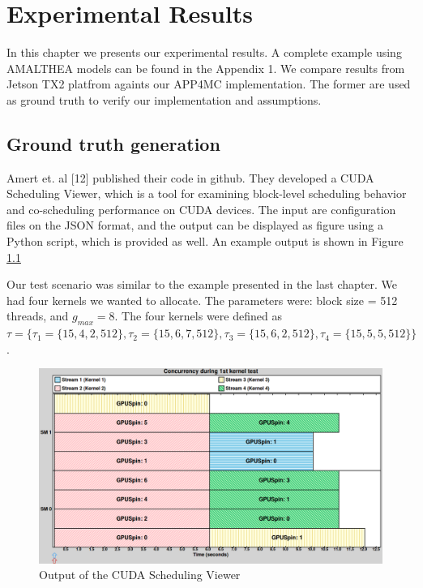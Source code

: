 \documentclass[
  12pt,
  a4paperpaper,
]{report}
\begin{document}
\hypertarget{experimental-results}{%
\chapter{Experimental Results}\label{experimental-results}}

In this chapter we presents our experimental results. A complete example
using AMALTHEA models can be found in the Appendix 1. We compare results
from Jetson TX2 platfrom againts our APP4MC implementation. The former
are used as ground truth to verify our implementation and assumptions.

\hypertarget{ground-truth-generation}{%
\section{Ground truth generation}\label{ground-truth-generation}}

Amert et. al {[}12{]} published their code in github. They developed a
CUDA Scheduling Viewer, which is a tool for examining block-level
scheduling behavior and co-scheduling performance on CUDA devices. The
input are configuration files on the JSON format, and the output can be
displayed as figure using a Python script, which is provided as well. An
example output is shown in Figure \ref{img:nvidia-base}

Our test scenario was similar to the example presented in the last
chapter. We had four kernels we wanted to allocate. The parameters were:
block size = 512 threads, and \(g_{max} = 8\). The four kernels were
defined as
\(\tau = \{\tau_1 = \{15, 4, 2, 512\} , \tau_2 = \{15, 6,7,512\}, \tau_3 = \{15, 6,2,512\}, \tau_4 =\{ 15, 5,5,512\} \}\).

\begin{figure}
\centering
\includegraphics{source/figures/nvidia/base.png}
\caption{Output of the CUDA Scheduling Viewer \label{img:nvidia-base}}
\end{figure}
\end{document}
